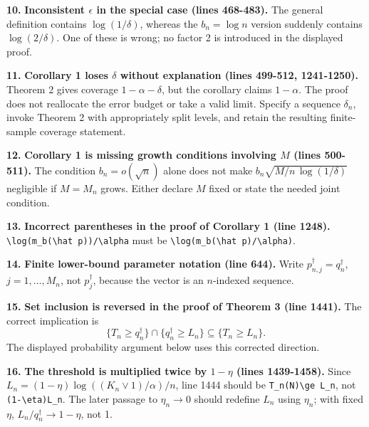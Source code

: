 \documentclass[10pt,a4paper]{article}
\begin{document}
\par\medskip\noindent\textbf{10.} \textbf{Inconsistent \(\epsilon\) in the special case (lines 468-483).} The general definition contains \(\log(1/\delta)\), whereas the \(b_n=\log n\) version suddenly contains \(\log(2/\delta)\). One of these is wrong; no factor 2 is introduced in the displayed proof.

\par\medskip\noindent\textbf{11.} \textbf{Corollary 1 loses \(\delta\) without explanation (lines 499-512, 1241-1250).} Theorem 2 gives coverage \(1-\alpha-\delta\), but the corollary claims \(1-\alpha\). The proof does not reallocate the error budget or take a valid limit. Specify a sequence \(\delta_n\), invoke Theorem 2 with appropriately split levels, and retain the resulting finite-sample coverage statement.

\par\medskip\noindent\textbf{12.} \textbf{Corollary 1 is missing growth conditions involving \(M\) (lines 500-511).} The condition \(b_n=o(\sqrt n)\) alone does not make
\(b_n\sqrt{M/n\,\log(1/\delta)}\) negligible if \(M=M_n\) grows. Either declare \(M\) fixed or state the needed joint condition.

\par\medskip\noindent\textbf{13.} \textbf{Incorrect parentheses in the proof of Corollary 1 (line 1248).}
\texttt{\textbackslash{}\allowbreak{}log(m\_\allowbreak{}b(\textbackslash{}\allowbreak{}hat p))/\textbackslash{}\allowbreak{}alpha} must be \texttt{\textbackslash{}\allowbreak{}log(m\_\allowbreak{}b(\textbackslash{}\allowbreak{}hat p)/\textbackslash{}\allowbreak{}alpha)}.

\par\medskip\noindent\textbf{14.} \textbf{Finite lower-bound parameter notation (line 644).} Write \(p_{n,j}^\dagger=q_n^\dagger\), \(j=1,\dots,M_n\), not \(p_j^\dagger\), because the vector is an \(n\)-indexed sequence.

\par\medskip\noindent\textbf{15.} \textbf{Set inclusion is reversed in the proof of Theorem 3 (line 1441).} The correct implication is
\[
    \{T_n\ge q_n^\dagger\}\cap\{q_n^\dagger\ge L_n\}\subseteq\{T_n\ge L_n\}.
\]
The displayed probability argument below uses this corrected direction.

\par\medskip\noindent\textbf{16.} \textbf{The threshold is multiplied twice by \(1-\eta\) (lines 1439-1458).} Since \(L_n=(1-\eta)\log((K_n\vee1)/\alpha)/n\), line 1444 should be \texttt{T\_\allowbreak{}n(N)\textbackslash{}\allowbreak{}ge L\_\allowbreak{}n}, not \texttt{(1-\textbackslash{}\allowbreak{}eta)L\_\allowbreak{}n}. The later passage to \(\eta_n\to0\) should redefine \(L_n\) using \(\eta_n\); with fixed \(\eta\), \(L_n/q_n^\dagger\to1-\eta\), not 1.
\end{document}
